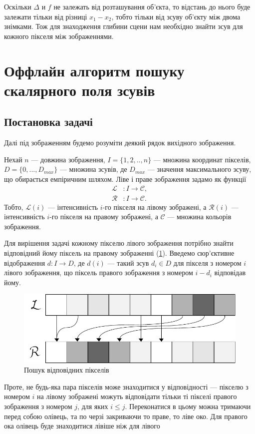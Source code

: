 Оскільки $\Delta$ и $f$ не залежать від розташування об'єкта, то відстань до нього буде залежати тільки від різниці $x_1 - x_2$, тобто тільки від зсуву об'єкту між двома знімками. Тож для знаходження глибини сцени нам необхідно знайти зсув для кожного пікселя між зображеннями.
	


\section{Оффлайн алгоритм пошуку скалярного поля зсувів}\label{offline}
\subsection{Постановка задачі}
Далі під зображенням будемо розуміти деякий рядок вихідного зображення.

Нехай $n$ --- довжина зображення, $I = \{1, 2, .., n\}$ --- множина координат пікселів, $D = \{0, ... , D_{max}\}$ ---  множина зсувів, де $D_{max}$ --- значення максимального зсуву, що обирається емпіричним шляхом. 
Ліве і праве зображення задамо як функції
\begin{align*}
	\mathcal{L} &: I \rightarrow \mathcal{C} , \\
	\mathcal{R} &: I \rightarrow \mathcal{C} .
\end{align*}
Тобто, $\mathcal{L}(i)$ --- інтенсивність $i$-го пікселя на лівому зображені, а $\mathcal{R}(i)$ --- інтенсивність $i$-го пікселя на правому зображені, а $ \mathcal{C} $ --- множина кольорів зображення.

Для вирішення задачі кожному пікселю лівого зображення потрібно знайти відповідний йому піксель на правому зображенні (\ref{mapping}). Введемо сюр'єктивне відображення $ d : I \rightarrow D $, де $ d(i) $ --- такий зсув $ d_i \in D$ для пікселя з номером $i$ лівого зображення, що піксель правого зображення  з номером $i - d_i$ відповідав йому.
\begin{figure}[h!]
	\centering
	\includegraphics[scale = 1]{mapping.pdf}
	\caption{Пошук відповідних пікселів}
	\label{mapping}
\end{figure}
Проте, не будь-яка пара пікселів може знаходитися у відповідності --- пікселю з номером $i$ на лівому зображені можуть відповідати тільки ті пікселі  правого зображення з номером $j$, для яких $i \leq j$. Переконатися в цьому можна тримаючи перед собою олівець, та по черзі закриваючи то праве, то ліве око. Для правого ока олівець буде знаходитися лівіше ніж для лівого

